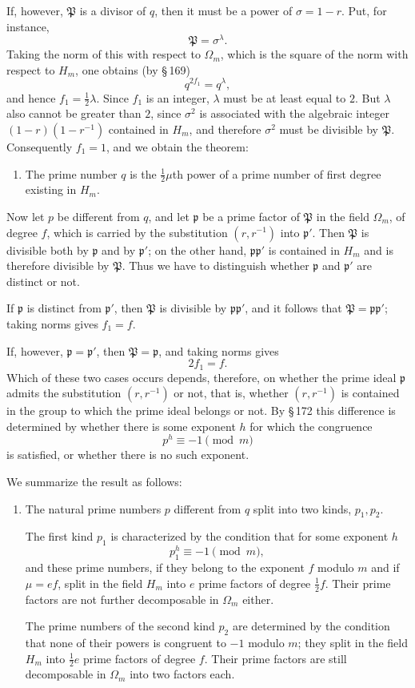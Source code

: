 \documentclass[11pt]{article}
\newcommand{\frp}{\mathfrak p}
\newcommand{\frP}{\mathfrak P}
\begin{document}
If, however, $\frP$ is a divisor of $q$, then it must be a power of $\sigma=1-r$. Put, for instance,
\[
\frP=\sigma^\lambda.
\]
Taking the norm of this with respect to $\Omega_m$, which is the square of the norm with respect to $H_m$, one obtains (by \S\,169)
\[
q^{2f_1}=q^\lambda,
\]
and hence $f_1=\frac12\lambda$. Since $f_1$ is an integer, $\lambda$ must be at least equal to $2$. But $\lambda$ also cannot be greater than $2$, since $\sigma^2$ is associated with the algebraic integer $(1-r)(1-r^{-1})$ contained in $H_m$, and therefore $\sigma^2$ must be divisible by $\frP$. Consequently $f_1=1$, and we obtain the theorem:

\begin{enumerate}[label=\arabic*.,leftmargin=2.2em]
\item The prime number $q$ is the $\frac12\mu$th power of a prime number of first degree existing in $H_m$.
\end{enumerate}

Now let $p$ be different from $q$, and let $\frp$ be a prime factor of $\frP$ in the field $\Omega_m$, of degree $f$, which is carried by the substitution $(r,r^{-1})$ into $\frp'$. Then $\frP$ is divisible both by $\frp$ and by $\frp'$; on the other hand, $\frp\frp'$ is contained in $H_m$ and is therefore divisible by $\frP$. Thus we have to distinguish whether $\frp$ and $\frp'$ are distinct or not.

If $\frp$ is distinct from $\frp'$, then $\frP$ is divisible by $\frp\frp'$, and it follows that $\frP=\frp\frp'$; taking norms gives $f_1=f$.

If, however, $\frp=\frp'$, then $\frP=\frp$, and taking norms gives
\[
2f_1=f.
\]
Which of these two cases occurs depends, therefore, on whether the prime ideal $\frp$ admits the substitution $(r,r^{-1})$ or not, that is, whether $(r,r^{-1})$ is contained in the group to which the prime ideal belongs or not. By \S\,172 this difference is determined by whether there is some exponent $h$ for which the congruence
\[
p^h\equiv -1\pmod m
\]
is satisfied, or whether there is no such exponent.

We summarize the result as follows:

\begin{enumerate}[label=\arabic*.,leftmargin=2.2em,start=2]
\item The natural prime numbers $p$ different from $q$ split into two kinds, $p_1,p_2$.

The first kind $p_1$ is characterized by the condition that for some exponent $h$
\[
p_1^h\equiv -1\pmod m,
\]
and these prime numbers, if they belong to the exponent $f$ modulo $m$ and if $\mu=ef$, split in the field $H_m$ into $e$ prime factors of degree $\frac12f$. Their prime factors are not further decomposable in $\Omega_m$ either.

The prime numbers of the second kind $p_2$ are determined by the condition that none of their powers is congruent to $-1$ modulo $m$; they split in the field $H_m$ into $\frac12e$ prime factors of degree $f$. Their prime factors are still decomposable in $\Omega_m$ into two factors each.
\end{enumerate}
\end{document}
